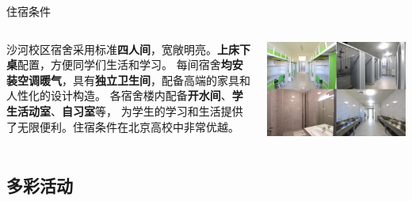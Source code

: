 \documentclass[aspectratio=169, utf8, fontset=windows]{beamer}
\begin{document}
\begin{frame}{住宿条件}
    \begin{columns}
        \setlength{\parindent}{2em}

        沙河校区宿舍采用标准\textcolor{Fore}{\textbf{四人间}}，宽敞明亮。\textcolor{Fore}{\textbf{上床下桌}}配置，方便同学们生活和学习。
        每间宿舍\textcolor{Fore}{\textbf{均安装空调暖气}}，具有\textcolor{Fore}{\textbf{独立卫生间}}，配备高端的家具和人性化的设计构造。
        各宿舍楼内配备\textcolor{Fore}{\textbf{开水间}}、\textcolor{Fore}{\textbf{学生活动室}}、\textcolor{Fore}{\textbf{自习室}}等，
        为学生的学习和生活提供了无限便利。住宿条件在北京高校中非常优越。

        \includegraphics[width=\textwidth]{./resources/24.png}
    \end{columns}
\end{frame}

\subsection*{多彩活动}
\end{document}
